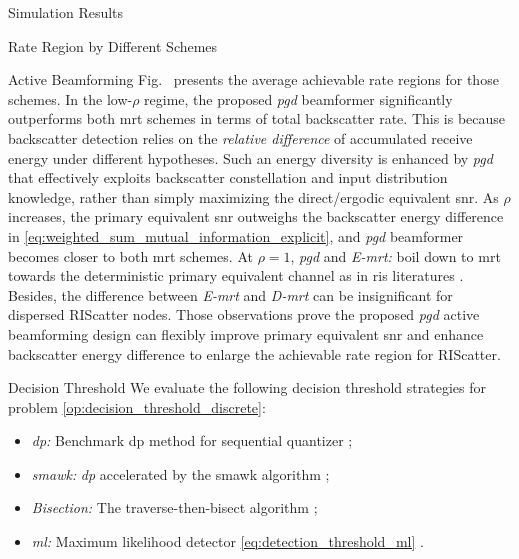 \documentclass[journal]{IEEEtran}
\begin{document}
\begin{section}{Simulation Results}
\begin{subsection}{Rate Region by Different Schemes}
\begin{subsubsection}{Active Beamforming}
			Fig.~ presents the average achievable rate regions for those schemes.
			In the low-$\rho$ regime, the proposed \emph{\gls{pgd}} beamformer significantly outperforms both \gls{mrt} schemes in terms of total backscatter rate.
			This is because backscatter detection relies on the \emph{relative difference} of accumulated receive energy under different hypotheses.
			Such an energy diversity is enhanced by \emph{\gls{pgd}} that effectively exploits backscatter constellation and input distribution knowledge, rather than simply maximizing the direct/ergodic equivalent \gls{snr}.
			As $\rho$ increases, the primary equivalent \gls{snr} outweighs the backscatter energy difference in \eqref{eq:weighted_sum_mutual_information_explicit}, and \emph{\gls{pgd}} beamformer becomes closer to both \gls{mrt} schemes.
			At $\rho=1$, \emph{\gls{pgd}} and \emph{E-\gls{mrt}:} boil down to \gls{mrt} towards the deterministic primary equivalent channel as in \gls{ris} literatures \cite{Wu2019}.
			Besides, the difference between \emph{E-\gls{mrt}} and \emph{D-\gls{mrt}} can be insignificant for dispersed RIScatter nodes.
			Those observations prove the proposed \emph{\gls{pgd}} active beamforming design can flexibly improve primary equivalent \gls{snr} and enhance backscatter energy difference to enlarge the achievable rate region for RIScatter.
		\end{subsubsection}

		\begin{subsubsection}{Decision Threshold}
			We evaluate the following decision threshold strategies for problem \eqref{op:decision_threshold_discrete}:
			\begin{itemize}
				\item \emph{\gls{dp}:} Benchmark \gls{dp} method for sequential quantizer \cite{He2021};
				\item \emph{\gls{smawk}:} \emph{\gls{dp}} accelerated by the \gls{smawk} algorithm \cite{He2021};
				\item \emph{Bisection:} The traverse-then-bisect algorithm \cite{Nguyen2020a};
				\item \emph{\gls{ml}:} Maximum likelihood detector \eqref{eq:detection_threshold_ml} \cite{Qian2019}.
			\end{itemize}


\end{subsubsection}
\end{subsection}
\end{section}
\end{document}

